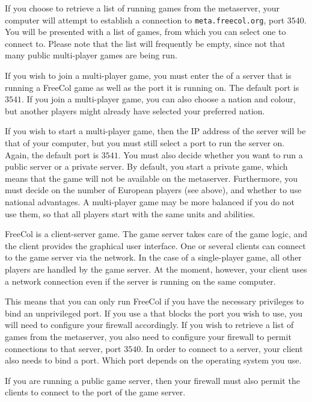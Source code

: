 \documentclass[12pt]{book}
\begin{document}
If you choose to retrieve a list of running games from the metaserver,
your computer will attempt to establish a connection to
\verb$meta.freecol.org$, port $3540$. You will be
presented with a list of games, from which you can select one to
connect to. Please note that the list will frequently be empty, since
not that many public multi-player games are being run.

If you wish to join a multi-player game, you must enter the
 of a server that is running a FreeCol game as
well as the port it is running on. The default port is
$3541$. If you join a multi-player game, you can also
choose a nation and colour, but another players might already have
selected your preferred nation.

If you wish to start a multi-player game, then the IP address of the
server will be that of your computer, but you must still select a port
to run the server on. Again, the default port is $3541$. You must also
decide whether you want to run a public server or a private server. By
default, you start a private game, which means that the game will not
be available on the metaserver. Furthermore, you must decide on the
number of European players (see above), and whether to use national
advantages. A multi-player game may be more balanced if you do not use
them, so that all players start with the same units and abilities.

FreeCol is a client-server game. The game server takes care of the
game logic, and the client provides the graphical user interface. One
or several clients can connect to the game server via the network. In
the case of a single-player game, all other players are handled by the
game server. At the moment, however, your client uses a network
connection even if the server is running on the same computer.

This means that you can only run FreeCol if you have the necessary
privileges to bind an unprivileged port. If you use a
 that blocks the port you wish to use, you
will need to configure your firewall accordingly. If you wish to
retrieve a list of games from the metaserver, you also need to
configure your firewall to permit connections to that server, port
$3540$. In order to connect to a server, your client also needs to
bind a port. Which port depends on the operating system you use.

If you are running a public game server, then your firewall must also
permit the clients to connect to the port of the game server.
\end{document}
